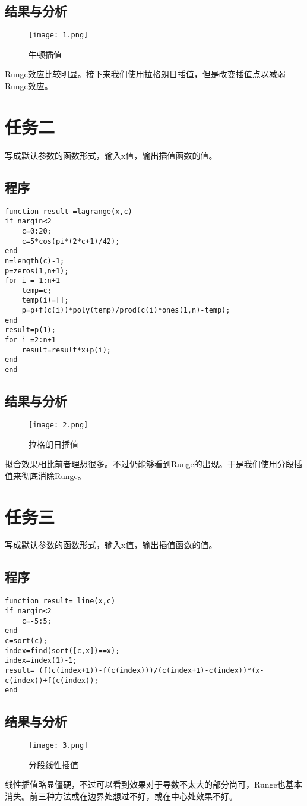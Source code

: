 \documentclass[a4paper,11pt,onecolumn,twoside]{article}
\begin{document}
\subsection{结果与分析}
\begin{figure}[htbp]
  \centering
  \texttt{[image: 1.png]}
  \caption{牛顿插值} \label{1}
\end{figure}
Runge效应比较明显。接下来我们使用拉格朗日插值，但是改变插值点以减弱Runge效应。

\section{任务二}
写成默认参数的函数形式，输入x值，输出插值函数的值。
\subsection{程序}
\begin{lstlisting}
function result =lagrange(x,c)
if nargin<2
    c=0:20;
    c=5*cos(pi*(2*c+1)/42);
end
n=length(c)-1;
p=zeros(1,n+1);
for i = 1:n+1
    temp=c;
    temp(i)=[];
    p=p+f(c(i))*poly(temp)/prod(c(i)*ones(1,n)-temp);
end
result=p(1);
for i =2:n+1
    result=result*x+p(i);
end
end
\end{lstlisting}
\subsection{结果与分析}
\begin{figure}[htbp]
  \centering
  \texttt{[image: 2.png]}
  \caption{拉格朗日插值} \label{2}
\end{figure}
拟合效果相比前者理想很多。不过仍能够看到Runge的出现。于是我们使用分段插值来彻底消除Runge。

\section{任务三}
写成默认参数的函数形式，输入x值，输出插值函数的值。
\subsection{程序}
\begin{lstlisting}
function result= line(x,c)
if nargin<2
    c=-5:5;
end
c=sort(c);
index=find(sort([c,x])==x);
index=index(1)-1;
result= (f(c(index+1))-f(c(index)))/(c(index+1)-c(index))*(x-c(index))+f(c(index));
end
\end{lstlisting}
\subsection{结果与分析}
\begin{figure}[htbp]
  \centering
  \texttt{[image: 3.png]}
  \caption{分段线性插值} \label{3}
\end{figure}
线性插值略显僵硬，不过可以看到效果对于导数不太大的部分尚可，Runge也基本消失。前三种方法或在边界处想过不好，或在中心处效果不好。
\end{document}
